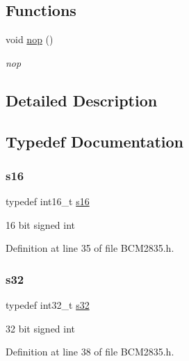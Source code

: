 \subsection*{Functions}
\begin{DoxyCompactItemize}
\item 
void \hyperlink{group__Common_ga9feb7476507383309c8e3ff2648016f3}{nop} ()
\begin{DoxyCompactList}\small\item\em nop \end{DoxyCompactList}\end{DoxyCompactItemize}


\subsection{Detailed Description}


\subsection{Typedef Documentation}
\mbox{\label{group__Common_gaa980e2c02ba2305e0f489d5650655425}} 
\subsubsection{\texorpdfstring{s16}{s16}}
{\footnotesize\ttfamily typedef int16\+\_\+t \hyperlink{group__Common_gaa980e2c02ba2305e0f489d5650655425}{s16}}



16 bit signed int 



Definition at line 35 of file B\+C\+M2835.\+h.

\mbox{\label{group__Common_gae9b1af5c037e57a98884758875d3a7c4}} 
\subsubsection{\texorpdfstring{s32}{s32}}
{\footnotesize\ttfamily typedef int32\+\_\+t \hyperlink{group__Common_gae9b1af5c037e57a98884758875d3a7c4}{s32}}



32 bit signed int 



Definition at line 38 of file B\+C\+M2835.\+h.

